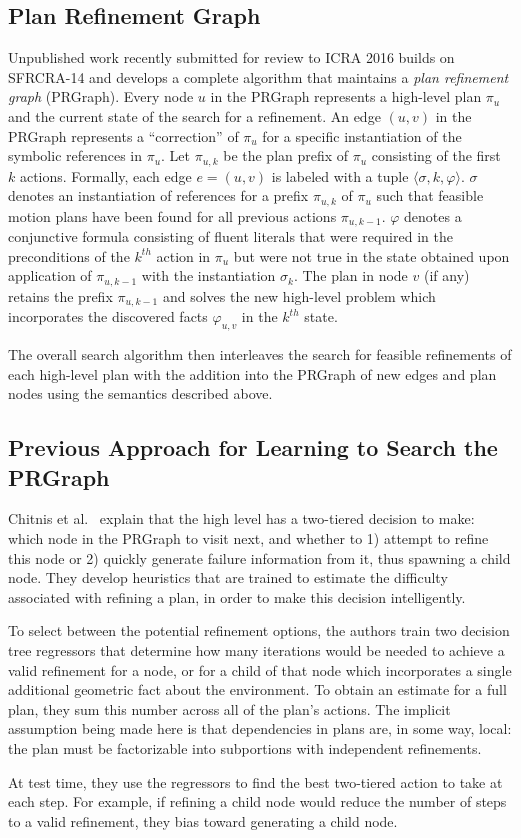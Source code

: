 \subsection{Plan Refinement Graph}
Unpublished work recently submitted for review to ICRA 2016 builds on SFRCRA-14 and develops a complete algorithm
that maintains a \emph{plan refinement graph} (PRGraph). Every node $u$ in the PRGraph
represents a high-level plan $\pi_u$ and the current state of the search
for a refinement. An edge $(u,v)$ in the PRGraph
represents a ``correction'' of $\pi_u$ for a specific instantiation of
the symbolic references in $\pi_u$. Let $\pi_{u,k}$ be the plan prefix of
$\pi_u$ consisting of the first $k$ actions. Formally, each edge
$e=(u,v)$ is labeled with a tuple $\langle \sigma, k, \varphi \rangle$.
$\sigma$ denotes an instantiation of references for a prefix $\pi_{u,k}$ of
$\pi_u$ such that feasible motion plans have been found for all
previous actions $\pi_{u,k-1}$. $\varphi$ denotes a conjunctive formula
consisting of fluent literals
that were required in the preconditions of the $k^{th}$ action in
$\pi_u$ but were not true in the state obtained upon
application of $\pi_{u,k-1}$ with the instantiation $\sigma_k$.  The
plan in node $v$ (if any) retains the prefix $\pi_{u,k-1}$ and solves
the new high-level problem which incorporates the discovered facts $\varphi_{u,v}$
in the $k^{th}$ state.

The overall search algorithm then interleaves the search for feasible
refinements of each high-level plan with the addition into the
PRGraph of new edges and plan nodes using the semantics described above.

\subsection{Previous Approach for Learning to Search the PRGraph}
Chitnis et al.~\cite{chitnis2015mlpc} explain that the high level has a two-tiered
decision to make: which node in the PRGraph to
visit next, and whether to 1) attempt to refine this node or 2) quickly generate failure information
from it, thus spawning a child node. They develop heuristics that are trained to estimate
the difficulty associated with refining a plan, in order to make this decision intelligently.

To select between the potential refinement options, the authors train two decision tree regressors
that determine how many iterations would be needed to achieve a valid refinement for a node, or for a child
of that node which incorporates a single additional geometric fact about the environment.
To obtain an estimate for a full plan, they sum this number across all of the plan's actions.
The implicit assumption being made here is that dependencies in plans are, in some way, local:
the plan must be factorizable into subportions with independent refinements.

At test time, they use the regressors to find the best two-tiered action to take at each step.
For example, if refining a child node would reduce the number of steps to a valid refinement,
they bias toward generating a child node.